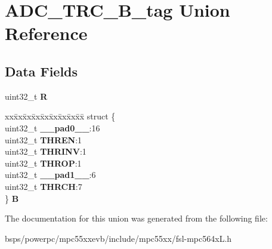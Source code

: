 \hypertarget{unionADC__TRC__32B__tag}{}\section{A\+D\+C\+\_\+\+T\+R\+C\+\_\+B\+\_\+tag Union Reference}
\label{unionADC__TRC__32B__tag}
\subsection*{Data Fields}
\begin{DoxyCompactItemize}
\item 
\mbox{\label{unionADC__TRC__32B__tag_a280e446c9ec3f6d33f9cdb97f6887391}} 
uint32\+\_\+t {\bfseries R}
\item 
\mbox{\label{unionADC__TRC__32B__tag_af1f05f273247888d03c19ccb8942a136}} 
\begin{tabbing}
xx\=xx\=xx\=xx\=xx\=xx\=xx\=xx\=xx\=\kill
struct \{\\
\>uint32\_t {\bfseries \_\_pad0\_\_}:16\\
\>uint32\_t {\bfseries THREN}:1\\
\>uint32\_t {\bfseries THRINV}:1\\
\>uint32\_t {\bfseries THROP}:1\\
\>uint32\_t {\bfseries \_\_pad1\_\_}:6\\
\>uint32\_t {\bfseries THRCH}:7\\
\} {\bfseries B}\\

\end{tabbing}\end{DoxyCompactItemize}


The documentation for this union was generated from the following file\+:\begin{DoxyCompactItemize}
\item 
bsps/powerpc/mpc55xxevb/include/mpc55xx/fsl-\/mpc564x\+L.\+h\end{DoxyCompactItemize}
